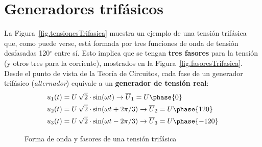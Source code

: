 	
	
	\section{Generadores trifásicos}
	La Figura~\ref{fig.tensionesTrifasica} muestra un ejemplo de una tensión trifásica que, como puede verse, está formada por tres funciones de onda de tensión desfasadas 120$^\circ$ entre sí. Esto implica que se tengan \textbf{tres fasores} para la tensión (y otros tres para la corriente), mostrados en la Figura~\ref{fig.fasoresTrifasica}.  Desde el punto de vista de la Teoría de Circuitos, cada fase de un generador trifásico (\textit{alternador}) equivale a un \textbf{generador de tensión real}:
	\begin{align*}
		u_1(t) &= U\,\sqrt{2}\cdot \sin(\omega t)\rightarrow  \overline{U}_1 = U\phase{0}\\
		u_2(t) &= U\,\sqrt{2} \cdot\sin(\omega t + 2\pi/3) \rightarrow  \overline{U}_2 = U\phase{120}\\
		u_3(t) &= U\,\sqrt{2}\cdot \sin(\omega t - 2\pi/3) \rightarrow  \overline{U}_3 = U\phase{-120}
	\end{align*}
	\begin{figure}
		\centering
		 \hfill
		\caption{Forma de onda y fasores de una tensión trifásica}
		\label{fig.tensiontrifasica}
	\end{figure}
